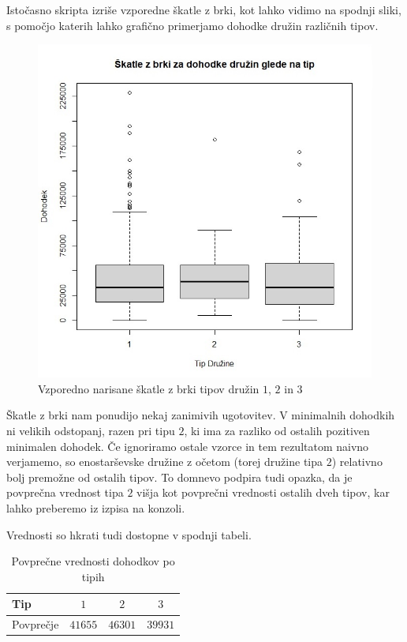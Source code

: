 \documentclass[a4paper, 10pt]{article}
\begin{document}
	Istočasno skripta izriše vzporedne škatle z brki, kot lahko vidimo na spodnji sliki, s pomočjo katerih lahko grafično primerjamo dohodke družin različnih tipov.
	
	\begin{figure}[h!]
		\centering
		\includegraphics[scale = 0.35]{TabelaSample1}
		\caption{Vzporedno narisane škatle z brki tipov družin $1$, $2$ in $3$}
	\end{figure}
	Škatle z brki nam ponudijo nekaj zanimivih ugotovitev. V minimalnih dohodkih ni velikih odstopanj, razen pri tipu $2$, ki ima za razliko od ostalih pozitiven minimalen dohodek. Če ignoriramo ostale vzorce in tem rezultatom naivno verjamemo, so enostarševske družine z očetom (torej družine tipa $2$) relativno bolj premožne od ostalih tipov. To domnevo podpira tudi opazka, da je povprečna vrednost tipa $2$ višja kot povprečni vrednosti ostalih dveh tipov, kar lahko preberemo iz izpisa na konzoli. 

	Vrednosti so hkrati tudi dostopne v spodnji tabeli. 

	\begin{table}[h!]
		\centering
		\begin{tabular}{|l|c|c|c|}
			\hline
			Tip & $1$ & $2$ & $3$ \\ \hline
			Povprečje & $41655$ & $46301$ & $39931$ \\ \hline
		\end{tabular}
	\caption{Povprečne vrednosti dohodkov po tipih}
	\end{table}
\end{document}
